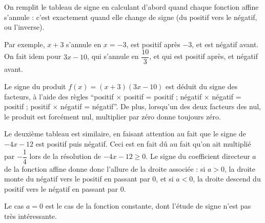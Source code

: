 {\begin{center}
	
%	       		
	\end{center}


	On remplit le tableau de signe en calculant d'abord quand chaque fonction affine s'annule : c'est exactement quand elle change de signe (du positif vers le négatif, ou l'inverse).
	
	Par exemple, $x+3$ s'annule en $x=-3$, est positif après $-3$, et est négatif avant.
	On fait idem pour $3x-10$, qui s'annule en $\dfrac{10}3$, et qui est positif après, et négatif avant.
	
	Le signe du produit $f(x) = (x+3)(3x-10)$ est déduit du signe des facteurs, à l'aide des règles ``positif $\times$ positif = positif ; négatif $\times$ négatif = positif ; positif $\times$ négatif = négatif''.
	De plus, lorsqu'un des deux facteurs des nul, le produit est forcément nul, multiplier par zéro donne toujours zéro.
	
	Le deuxième tableau est similaire, en faisant attention au fait que le signe de $-4x-12$ est positif puis négatif.
	Ceci est en fait dû au fait qu'on ait multiplié par $-\dfrac14$ lors de la résolution de $-4x-12 \geq 0$.
	Le signe du coefficient directeur $a$ de la fonction affine donne donc l'allure de la droite associée : si $a>0$, la droite monte du négatif vers le positif en passant par $0$, et si $a <0$, la droite descend du positif vers le négatif en passant par $0$.
	
	Le cas $a=0$ est le cas de la fonction constante, dont l'étude de signe n'est pas très intéressante.
}







